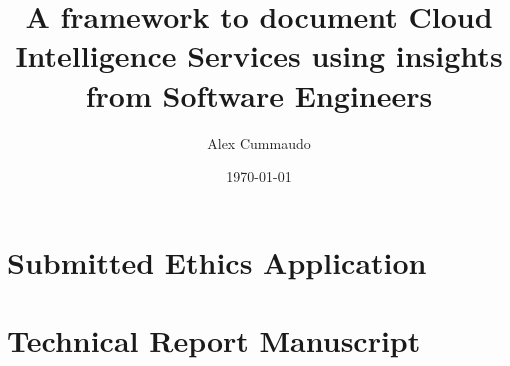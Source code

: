 \documentclass[twoside,12pt,titlepage]{book}
\title{A framework to document Cloud Intelligence Services
       using insights from Software Engineers}
\author{Alex Cummaudo}
\date{\today}
\begin{document}
\frontmatter


%
%


\mainmatter







\appendix
\chapter{Submitted Ethics Application}
\label{appx:ethics}
 
\chapter{Technical Report Manuscript}
\end{document}
